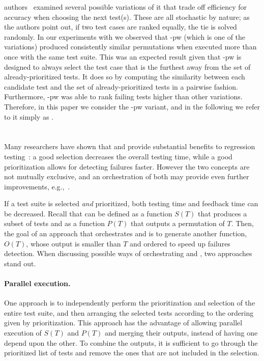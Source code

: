\fs authors~\cite{miranda_fast_2018} examined several possible variations of it
that trade off efficiency for accuracy when choosing the next test(s).
These are all stochastic by nature;
as the authors point out, if two test cases are ranked equally, the tie is solved randomly.
In our experiments with \fs we observed that \fs-pw (which is one of the variations) produced consistently similar permutations when executed more than once with the same test suite. 
This was an expected result given that \fs-pw is designed to always select the test case that is the furthest away from the set of already-prioritized tests.
It does so by computing the similarity between each candidate test and the set of already-prioritized tests in a pairwise fashion.
Furthermore, \fs-pw was able to rank failing tests  higher than other variations. 
Therefore, in this paper  we consider the \fs-pw variant, and in the following we refer to it simply as \fs.


\section{\fz}\label{sec:orch_fastazi}

Many researchers have shown that \tcs and \tcp  provide substantial benefits 
to regression testing~\cite{bin_ali_search_2019, kazmi_effective_2017, khatibsyarbini_test_2018, RothermelHarrold94FrameworkForEvaluationRTS}:
a good selection decreases the overall testing time, while a good prioritization allows for detecting failures faster.
However the two concepts are not mutually exclusive, and an orchestration of both may provide even further improvements, e.g.,~\cite{spieker_reinforcement_2017,elbaum2014techniques}.

If a test suite is selected \textit{and} prioritized, both testing time and feedback time can be decreased.
Recall that \tcs can be defined as a function $S(T)$ that produces a subset of tests and \tcp as a function $P(T)$ that outputs a permutation of $T$.
Then, the goal of an approach that orchestrates \tcs and \tcp is to generate another function, $O(T)$, 
whose output is smaller than $T$ and ordered to speed up failures detection.
When discussing possible ways of orchestrating \tcs and \tcp, two approaches stand out.

\paragraph{Parallel execution.} 
One approach is to independently perform the prioritization and selection of the entire test suite, and then arranging the selected tests according to the ordering given by prioritization.
This approach has the advantage of allowing parallel execution of $S(T)$ and $P(T)$ and merging their outputs, instead of having one depend upon the other.
To combine the outputs, it is sufficient to go through the prioritized list of tests and remove the ones that are not included in the selection.


